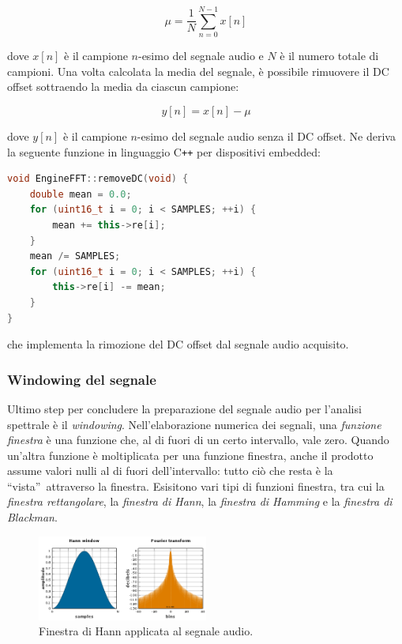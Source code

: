 \documentclass[a4paper,12pt]{report}  %
\begin{document}
\begin{equation}
    \mu = \frac{1}{N} \sum_{n = 0}^{N - 1} x[n] \nonumber
\end{equation}

dove $x[n]$ è il campione $n$-esimo del segnale audio e $N$ è il numero totale di campioni.
Una volta calcolata la media del segnale, è possibile rimuovere il DC offset sottraendo la media da ciascun campione:

\begin{equation}
    y[n] = x[n] - \mu \nonumber
\end{equation}

dove $y[n]$ è il campione $n$-esimo del segnale audio senza il DC offset.
Ne deriva la seguente funzione in linguaggio C\texttt{++} per dispositivi embedded:

\begin{lstlisting}[language=C++,keywords={void, double, float, this, uint16_t, this, for}]
void EngineFFT::removeDC(void) {
    double mean = 0.0;
    for (uint16_t i = 0; i < SAMPLES; ++i) {
        mean += this->re[i];
    }
    mean /= SAMPLES;
    for (uint16_t i = 0; i < SAMPLES; ++i) {
        this->re[i] -= mean;
    }
}
\end{lstlisting}

che implementa la rimozione del DC offset dal segnale audio acquisito.

\subsubsection{Windowing del segnale}\label{sec:windowing}
Ultimo step per concludere la preparazione del segnale audio per l'analisi spettrale è il \textit{windowing}.
Nell'elaborazione numerica dei segnali, una \textit{funzione finestra} è una funzione che, al di fuori di un certo intervallo, vale zero.
Quando un'altra funzione è moltiplicata per una funzione finestra, anche il prodotto assume valori nulli al di fuori dell'intervallo: tutto ciò che resta è la \textquotedblleft vista\textquotedblright \ attraverso la finestra.
Esisitono vari tipi di funzioni finestra, tra cui la \textit{finestra rettangolare}, la \textit{finestra di Hann}, la \textit{finestra di Hamming} e la \textit{finestra di Blackman}.

\begin{figure}[h]
    \centering
    \includegraphics[width=0.5\textwidth]{imgs/Window_function_Hann.png}
    \caption{Finestra di Hann applicata al segnale audio.}
    \label{fig:hann_window}
\end{figure}
\end{document}
